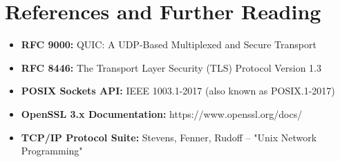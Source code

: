 \documentclass[12pt,a4paper]{article}
\begin{document}
\section{References and Further Reading}
\label{app:references}

\begin{itemize}
  \item \textbf{RFC 9000:} QUIC: A UDP-Based Multiplexed and Secure Transport
  \item \textbf{RFC 8446:} The Transport Layer Security (TLS) Protocol Version 1.3
  \item \textbf{POSIX Sockets API:} IEEE 1003.1-2017 (also known as POSIX.1-2017)
  \item \textbf{OpenSSL 3.x Documentation:} https://www.openssl.org/docs/
  \item \textbf{TCP/IP Protocol Suite:} Stevens, Fenner, Rudoff – "Unix Network Programming"
\end{itemize}
\end{document}
